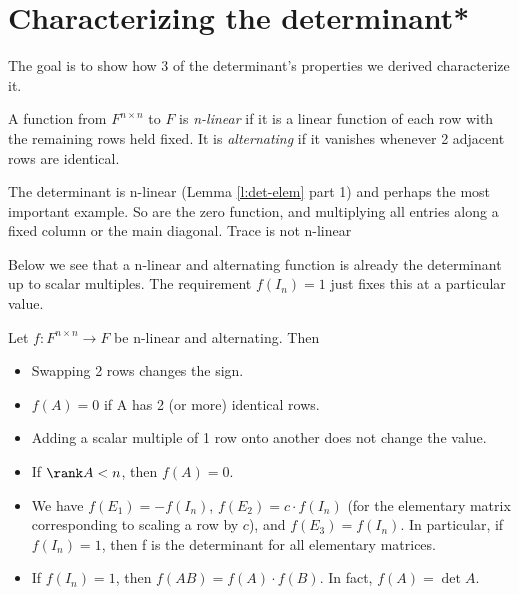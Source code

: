 \section{Characterizing the determinant*}
The goal is to show how 3 of the determinant's properties we derived characterize it.
\begin{defn}
A function from $F^{n \times n}$ to $F$ is \emph{n-linear} if it is a linear function of each row with the remaining rows held fixed.
It is \emph{alternating} if it vanishes whenever 2 adjacent rows are identical.
\end{defn}
\begin{example}
The determinant is n-linear (Lemma \ref{l:det-elem} part 1) and perhaps the most important example. So are the zero function, and multiplying all entries along a fixed column or the main diagonal. Trace is not n-linear
\end{example}
Below we see that a n-linear and alternating function is already the determinant up to scalar multiples. The requirement $f(I_n)=1$ just fixes this at a particular value.
\begin{lem}
Let $f:F^{n \times n}\to F$ be n-linear and alternating. Then 
\begin{itemize}
\item Swapping 2 rows changes the sign.
\item $f(A)=0$ if A has 2 (or more) identical rows.
\item Adding a scalar multiple of 1 row onto another does not change the value.
\item If $\rank A<n$, then $f(A)=0$.
\item We have $f(E_1)=-f(I_n)$, $f(E_2)=c \cdot f(I_n)$ (for the elementary matrix corresponding to scaling a row by $c$), and $f(E_3)=f(I_n)$. In particular, if $f(I_n)=1$, then f is the determinant for all elementary matrices.
\item If $f(I_n)=1$, then $f(AB)=f(A) \cdot f(B)$. In fact, $f(A)= \det A$.
\end{itemize}
\end{lem}
